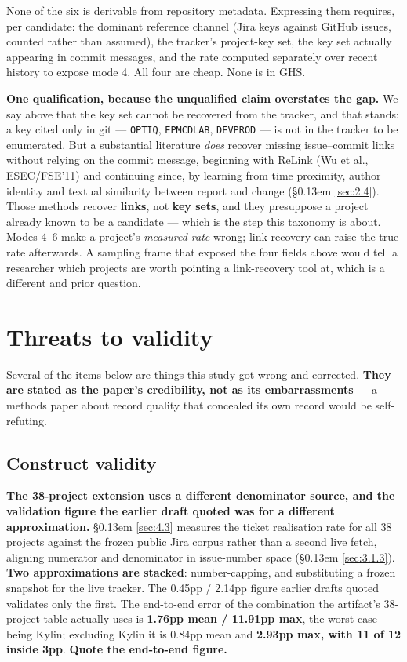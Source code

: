 \documentclass[sigconf,review,anonymous]{acmart}
\begin{document}
None of the six is derivable from repository metadata. Expressing them requires, per candidate: the dominant reference channel (Jira keys against GitHub issues, counted rather than assumed), the tracker's project-key set, the key set actually appearing in commit messages, and the rate computed separately over recent history to expose mode 4. All four are cheap. None is in GHS.

\textbf{One qualification, because the unqualified claim overstates the gap.} We say above that the key set cannot be recovered from the tracker, and that stands: a key cited only in git --- \texttt{OPTIQ}, \texttt{EPMCDLAB}, \texttt{DEVPROD} --- is not in the tracker to be enumerated. But a substantial literature \emph{does} recover missing issue--commit links without relying on the commit message, beginning with ReLink \cite{wu2011relink} (Wu et al., ESEC/FSE'11) and continuing since, by learning from time proximity, author identity and textual similarity between report and change (\S\kern0.13em \ref{sec:2.4}). Those methods recover \textbf{links}, not \textbf{key sets}, and they presuppose a project already known to be a candidate --- which is the step this taxonomy is about. Modes 4--6 make a project's \emph{measured rate} wrong; link recovery can raise the true rate afterwards. A sampling frame that exposed the four fields above would tell a researcher which projects are worth pointing a link-recovery tool at, which is a different and prior question.


\section{Threats to validity}
\label{sec:6}

Several of the items below are things this study got wrong and corrected. \textbf{They are stated as the paper's credibility, not as its embarrassments} --- a methods paper about record quality that concealed its own record would be self-refuting.

\subsection{Construct validity}
\label{sec:6.1}

\textbf{The 38-project extension uses a different denominator source, and the validation figure the earlier draft quoted was for a different approximation.} \S\kern0.13em \ref{sec:4.3} measures the ticket realisation rate for all 38 projects against the frozen public Jira corpus rather than a second live fetch, aligning numerator and denominator in issue-number space (\S\kern0.13em \ref{sec:3.1.3}). \textbf{Two approximations are stacked}: number-capping, and substituting a frozen snapshot for the live tracker. The 0.45pp / 2.14pp figure earlier drafts quoted validates only the first. The end-to-end error of the combination the artifact's 38-project table actually uses is \textbf{1.76pp mean / 11.91pp max}, the worst case being Kylin; excluding Kylin it is 0.84pp mean and \textbf{2.93pp max, with 11 of 12 inside 3pp}. \textbf{Quote the end-to-end figure.}
\end{document}
